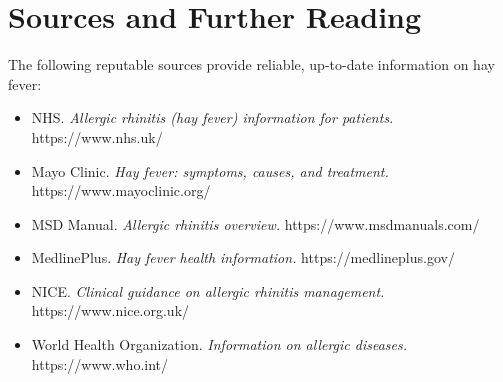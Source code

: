 \section*{Sources and Further Reading}
The following reputable sources provide reliable, up-to-date information on hay fever:

\begin{itemize}
    \item NHS. \textit{Allergic rhinitis (hay fever) information for patients.} https://www.nhs.uk/
    \item Mayo Clinic. \textit{Hay fever: symptoms, causes, and treatment.} https://www.mayoclinic.org/
    \item MSD Manual. \textit{Allergic rhinitis overview.} https://www.msdmanuals.com/
    \item MedlinePlus. \textit{Hay fever health information.} https://medlineplus.gov/
    \item NICE. \textit{Clinical guidance on allergic rhinitis management.} https://www.nice.org.uk/
    \item World Health Organization. \textit{Information on allergic diseases.} https://www.who.int/
\end{itemize}
